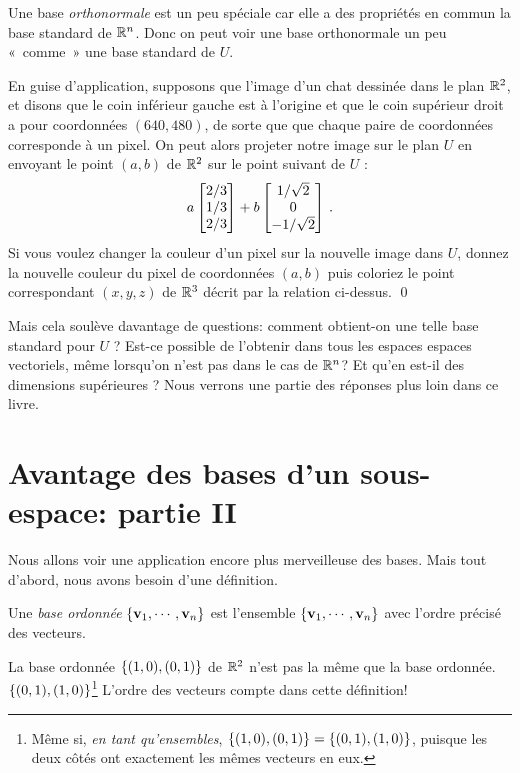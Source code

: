Une base \emph{orthonormale} est un peu spéciale car elle a des propriétés en commun la base standard de $\mathbb{R}^n$.  Donc on peut voir une base orthonormale un peu «~comme~» une base standard de $U$.

En guise d'application, supposons que l'image d'un chat dessinée dans le plan $\mathbb{R}^2$,
et disons que le coin inférieur gauche est à l'origine et que le coin supérieur droit a pour coordonnées $(640,480)$, de sorte que
que chaque paire de coordonnées corresponde à un pixel.
On peut alors projeter notre image sur le plan $U$ en envoyant le point $(a,b)$ de $\mathbb{R}^2$ sur le point suivant de $U$ :
$$
  a\left[ \begin{matrix} 2/3\\1/3\\2/3 \end{matrix} \right] + b\left[ \begin{matrix} 1/\sqrt{2}\\0\\-1/\sqrt{2} \end{matrix} \right]\,.
$$
Si vous voulez changer la couleur d'un pixel sur la nouvelle image dans $U$, donnez la nouvelle couleur
du pixel de coordonnées $(a,b)$ puis coloriez le point correspondant
$(x,y,z)$ de $\mathbb{R}^3$ décrit par la relation ci-dessus.
\qed

Mais cela soulève davantage de questions: comment obtient-on une telle 
base standard pour $U$ ?  Est-ce possible de l'obtenir dans tous les espaces espaces vectoriels, même lorsqu'on n'est pas dans le cas de $\mathbb{R}^n$? Et
qu'en est-il des dimensions supérieures ?  Nous verrons une partie des réponses plus loin dans ce livre.

\section{Avantage des bases d'un sous-espace: partie II}

Nous allons voir une application encore plus merveilleuse des bases. Mais tout d'abord, nous avons besoin d'une définition.

\begin{definition} Une {\it base ordonnée} $\{\mathbf{v}_1,\cdots, \mathbf{v}_n\}$ est l'ensemble $\{\mathbf{v}_1,\cdots, \mathbf{v}_n\}$ avec l'ordre pr\'ecisé des vecteurs.

\end{definition}
\begin{myexample} La base ordonnée $\{(1,0), (0,1)\}$ de $\mathbb{R}^2$ n'est pas la même que la base ordonnée. $\{ (0,1), (1,0)\}$\footnote{Même si, {\it en tant qu'ensembles}, $\{(1,0), (0,1)\}= \{ (0,1), (1,0)\}$, puisque les deux côtés ont exactement les mêmes vecteurs en eux. } L'ordre des vecteurs compte dans cette définition!
\end{myexample}

